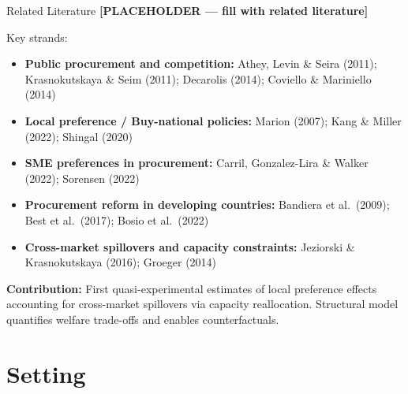 \documentclass[9pt,aspectratio=169]{beamer}
\begin{document}
\begin{frame}{Related Literature}
\textbf{[PLACEHOLDER — fill with related literature]}

\medskip
Key strands:
\begin{itemize}
  \item \textbf{Public procurement and competition:}
        Athey, Levin \& Seira (2011); Krasnokutskaya \& Seim (2011);
        Decarolis (2014); Coviello \& Mariniello (2014)
  \item \textbf{Local preference / Buy-national policies:}
        Marion (2007); Kang \& Miller (2022); Shingal (2020)
  \item \textbf{SME preferences in procurement:}
        Carril, Gonzalez-Lira \& Walker (2022); Sorensen (2022)
  \item \textbf{Procurement reform in developing countries:}
        Bandiera et al.\ (2009); Best et al.\ (2017); Bosio et al.\ (2022)
  \item \textbf{Cross-market spillovers and capacity constraints:}
        Jeziorski \& Krasnokutskaya (2016); Groeger (2014)
\end{itemize}

\medskip
\textbf{Contribution:} First quasi-experimental estimates of local preference
effects accounting for cross-market spillovers via capacity reallocation.
Structural model quantifies welfare trade-offs and enables counterfactuals.
\end{frame}


\section{Setting}
\end{document}
